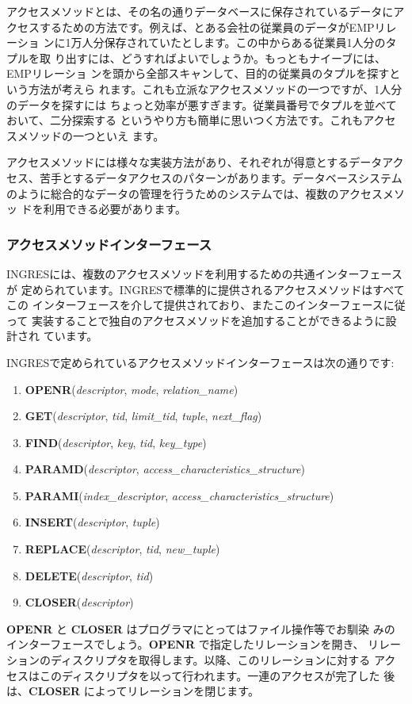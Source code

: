 アクセスメソッドとは、その名の通りデータベースに保存されているデータにア
クセスするための方法です。例えば、とある会社の従業員のデータがEMPリレーショ
ンに1万人分保存されていたとします。この中からある従業員1人分のタプルを取
り出すには、どうすればよいでしょうか。もっともナイーブには、EMPリレーショ
ンを頭から全部スキャンして、目的の従業員のタプルを探すという方法が考えら
れます。これも立派なアクセスメソッドの一つですが、1人分のデータを探すには
ちょっと効率が悪すぎます。従業員番号でタプルを並べておいて、二分探索する
というやり方も簡単に思いつく方法です。これもアクセスメソッドの一つといえ
ます。


アクセスメソッドには様々な実装方法があり、それぞれが得意とするデータアク
セス、苦手とするデータアクセスのパターンがあります。データベースシステム
のように総合的なデータの管理を行うためのシステムでは、複数のアクセスメソッ
ドを利用できる必要があります。


\subsubsection{アクセスメソッドインターフェース}


INGRESには、複数のアクセスメソッドを利用するための共通インターフェースが
定められています。INGRESで標準的に提供されるアクセスメソッドはすべてこの
インターフェースを介して提供されており、またこのインターフェースに従って
実装することで独自のアクセスメソッドを追加することができるように設計され
ています。


INGRESで定められているアクセスメソッドインターフェースは次の通りです:
\begin{enumerate}
 \item {\bf OPENR}({\it descriptor}, {\it mode}, {\it relation\_name})
 \item {\bf GET}({\it descriptor}, {\it tid}, {\it limit\_tid}, {\it
       tuple}, {\it next\_flag})
 \item {\bf FIND}({\it descriptor}, {\it key}, {\it tid}, {\it key\_type})
 \item {\bf PARAMD}({\it descriptor}, {\it access\_characteristics\_structure})
 \item {\bf PARAMI}({\it index\_descriptor}, {\it access\_characteristics\_structure})
 \item {\bf INSERT}({\it descriptor}, {\it tuple})
 \item {\bf REPLACE}({\it descriptor}, {\it tid}, {\it new\_tuple})
 \item {\bf DELETE}({\it descriptor}, {\it tid})
 \item {\bf CLOSER}({\it descriptor})
\end{enumerate}
{\bf OPENR} と {\bf CLOSER} はプログラマにとってはファイル操作等でお馴染
みのインターフェースでしょう。{\bf OPENR} で指定したリレーションを開き、
リレーションのディスクリプタを取得します。以降、このリレーションに対する
アクセスはこのディスクリプタを以って行われます。一連のアクセスが完了した
後は、{\bf CLOSER} によってリレーションを閉じます。


